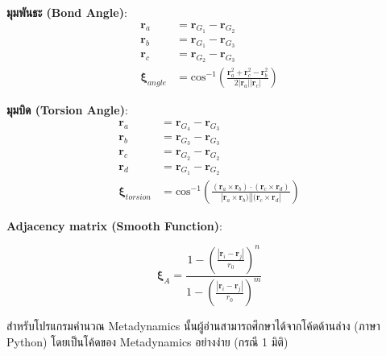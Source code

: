 \noindent \textbf{มุมพันธะ (Bond Angle)}:
\begin{align*}
  \mathbf{r}_{a} &= \mathbf{r}_{G_{1}} - \mathbf{r}_{G_{2}} \\
  \mathbf{r}_{b} &= \mathbf{r}_{G_{1}} - \mathbf{r}_{G_{3}} \\
  \mathbf{r}_{c} &= \mathbf{r}_{G_{2}} - \mathbf{r}_{G_{3}} \\
  \boldsymbol{\xi}_{angle} 
  &= 
  \text{cos}^{-1} \left( \frac{\mathbf{r}^2_{a} 
    + \mathbf{r}^2_{c} 
    - \mathbf{r}^2_{b}}{2|\mathbf{r}_{a}||\mathbf{r}_{c}|} \right)
\end{align*}

\noindent \textbf{มุมบิด (Torsion Angle)}:
\begin{align*}
  \mathbf{r}_{a} &= \mathbf{r}_{G_{4}} - \mathbf{r}_{G_{3}} \\
  \mathbf{r}_{b} &= \mathbf{r}_{G_{3}} - \mathbf{r}_{G_{3}} \\
  \mathbf{r}_{c} &= \mathbf{r}_{G_{2}} - \mathbf{r}_{G_{2}} \\
  \mathbf{r}_{d} &= \mathbf{r}_{G_{1}} - \mathbf{r}_{G_{2}} \\
  \boldsymbol{\xi}_{torsion} 
  &= 
  \text{cos}^{-1} \left( 
    \frac{(\mathbf{r}_{a} \times \mathbf{r}_{b}) 
      \cdot (\mathbf{r}_{c} \times \mathbf{r}_{d}) }{ 
        |\mathbf{r}_{a} \times \mathbf{r}_{b}) 
          || (\mathbf{r}_{c} \times \mathbf{r}_{d}| } \right)
\end{align*}

\noindent \textbf{Adjacency matrix (Smooth Function)}:

\begin{equation}
  \boldsymbol{\xi}_{A} = \frac{ 1-\left(\frac{|\mathbf{r}_{i} - \mathbf{r}_{j}|}{r_{0}}\right)^n }
  { 1-\left(\frac{|\mathbf{r}_{i} - \mathbf{r}_{j}|}{r_{0}}\right)^m }
\end{equation}

สำหรับโปรแกรมคำนวณ Metadynamics นั้นผู้อ่านสามารถศึกษาได้จากโค้ดด้านล่าง (ภาษา Python) โดยเป็นโค้ดของ Metadynamics อย่างง่าย
(กรณี 1 มิติ)

\vspace{5pt}

